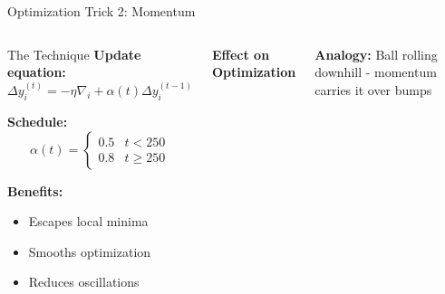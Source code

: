 \documentclass[aspectratio=169]{beamer}
\begin{document}
\begin{frame}{Optimization Trick 2: Momentum}
\begin{columns}
\begin{block}{The Technique}
\textbf{Update equation:}
\small
$$\Delta y_i^{(t)} = -\eta \nabla_i + \alpha(t) \Delta y_i^{(t-1)}$$
\normalsize

\textbf{Schedule:}
$$\alpha(t) = \begin{cases}
0.5 & t < 250 \\
0.8 & t \geq 250
\end{cases}$$

\textbf{Benefits:}
\begin{itemize}
\item Escapes local minima
\item Smooths optimization
\item Reduces oscillations
\end{itemize}
\end{block}

\begin{center}
\textbf{Effect on Optimization}\\[3mm]
\end{center}

\textbf{Analogy:} Ball rolling downhill - momentum carries it over bumps
\end{columns}
\end{frame}
\end{document}
